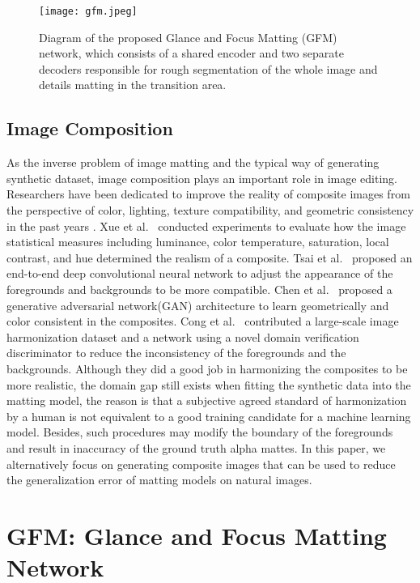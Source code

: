 \documentclass[twocolumn]{svjour3}
\begin{document}
\begin{figure*}[htbp]
    \texttt{[image: gfm.jpeg]}
    \caption{Diagram of the proposed Glance and Focus Matting (GFM) network, which consists of a shared encoder and two separate decoders responsible for rough segmentation of the whole image and details matting in the transition area.}
    \label{fig:network}
\end{figure*}

\subsection{Image Composition} 
As the inverse problem of image matting and the typical way of generating synthetic dataset, image composition plays an important role in image editing. Researchers have been dedicated to improve the reality of composite images from the perspective of color, lighting, texture compatibility, and geometric consistency in the past years \citep{xue2012understanding,dih,towardcomposition,dihdataset}. Xue et al.~\citep{xue2012understanding} conducted experiments to evaluate how the image statistical measures including luminance, color temperature, saturation, local contrast, and hue determined the realism of a composite. Tsai et al.~\citep{dih} proposed an end-to-end deep convolutional neural network to adjust the appearance of the foregrounds and backgrounds to be more compatible. Chen et al.~\citep{towardcomposition} proposed a generative adversarial network(GAN) architecture to learn geometrically and color consistent in the composites. Cong et al.~\citep{dihdataset} contributed a large-scale image harmonization dataset and a network using a novel domain verification discriminator to reduce the inconsistency of the foregrounds and the backgrounds. Although they did a good job in harmonizing the composites to be more realistic, the domain gap still exists when fitting the synthetic data into the matting model, the reason is that a subjective agreed standard of harmonization by a human is not equivalent to a good training candidate for a machine learning model. Besides, such procedures may modify the boundary of the foregrounds and result in inaccuracy of the ground truth alpha mattes. In this paper, we alternatively focus on generating composite images that can be used to reduce the generalization error of matting models on natural images.






\section{GFM: Glance and Focus Matting Network}
\end{document}
